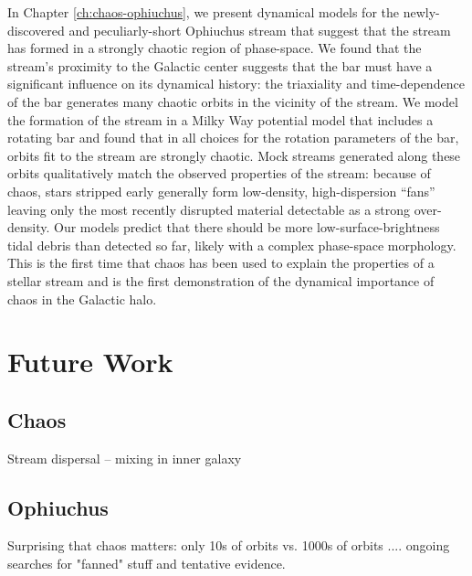 In Chapter \ref{ch:chaos-ophiuchus}, we present dynamical models for the newly-discovered and peculiarly-short Ophiuchus stream that suggest that the stream has formed in a strongly chaotic region of phase-space. We found that the stream's proximity to the Galactic center suggests that the bar must have a significant influence on its dynamical history: the triaxiality and time-dependence of the bar generates many chaotic orbits in the vicinity of the stream. We model the formation of the stream in a Milky Way potential model that includes a rotating bar and found that in all choices for the rotation parameters of the bar, orbits fit to the stream are strongly chaotic. Mock streams generated along these orbits qualitatively match the observed properties of the stream: because of chaos, stars stripped early generally form low-density, high-dispersion ``fans'' leaving only the most recently disrupted material detectable as a strong over-density. Our models predict that there should be more low-surface-brightness tidal debris than detected so far, likely with a complex phase-space morphology. This is the first time that chaos has been used to explain the properties of a stellar stream and is the first demonstration of the dynamical importance of chaos in the Galactic halo.

\section{Future Work} \label{sec:future-work}

\subsection{\rewinder}

\subsection{Chaos}

Stream dispersal -- mixing in inner galaxy

\subsection{Ophiuchus}

Surprising that chaos matters: only 10s of orbits vs. 1000s of orbits .... ongoing searches for "fanned" stuff and tentative evidence.